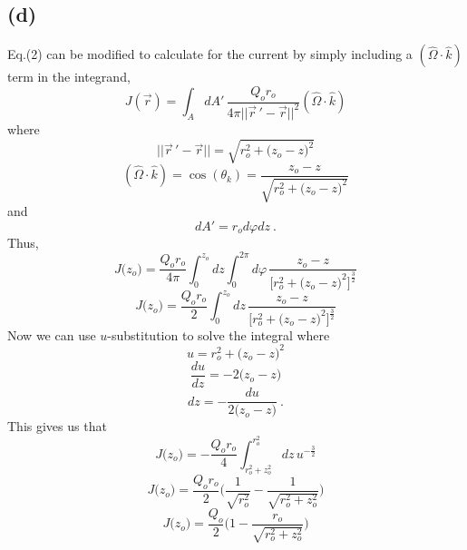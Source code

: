 \documentclass{article}
\begin{document}
\pagebreak

\subsection*{(d)}

Eq.(2) can be modified to calculate for the current by simply including a $(\hat{\Omega} \cdot \hat{k})$ term in the integrand, 
\begin{equation*}
J(\vec{r}) = \int_A dA' \, \frac{Q_o r_o}{4 \pi ||\vec{r}\,'-\vec{r}||^2} (\hat{\Omega} \cdot \hat{k})
\end{equation*}
where 
\begin{equation*}
||\vec{r}\,'-\vec{r}|| =  \sqrt{ r_o^2 + \big(z_o-z\big)^2 } 
\end{equation*}
\begin{equation*}
(\hat{\Omega} \cdot \hat{k}) = \cos(\theta_k) = \frac{z_o - z}{\sqrt{ r_o^2 + \big(z_o - z\big)^2 } }
\end{equation*}
and
\begin{equation*}
dA' = r_o d\varphi dz \: .
\end{equation*}
Thus,
\begin{equation*}
J\Big(z_o\Big) = \frac{Q_o r_o}{4\pi} \int_0^{z_o} dz \int_0^{2\pi} d\varphi \, \frac{z_o - z}{\Big[ r_o^2 + \big(z_o - z\big)^2 \Big]^{\frac{3}{2}}} 
\end{equation*}
\begin{equation*}
J\Big(z_o\Big) = \frac{Q_o r_o}{2} \int_0^{z_o} dz \, \frac{z_o - z}{\Big[ r_o^2 + \big(z_o - z\big)^2 \Big]^{\frac{3}{2}}} 
\end{equation*}
Now we can use $u$-substitution to solve the integral where
\begin{equation*}
u = r_o^2 + \big(z_o-z \big)^2
\end{equation*}
\begin{equation*}
\frac{du}{dz} = -2 \big(z_o-z \big)
\end{equation*}
\begin{equation*}
dz = - \frac{du}{2 \big(z_o-z \big)} \: .
\end{equation*}
This gives us that
\begin{equation*}
J\Big(z_o\Big) = - \frac{Q_o r_o}{4} \int_{r_o^2+z_o^2}^{r_o^2} dz \, u^{-\frac{3}{2}} 
\end{equation*}
\begin{equation*}
J\Big(z_o\Big) = \frac{Q_o r_o}{2} \Bigg( \frac{1}{\sqrt{r_o^2}} - \frac{1}{\sqrt{r_o^2+z_o^2}} \Bigg) 
\end{equation*}
\begin{equation*}
\boxed{ J\Big(z_o\Big) = \frac{Q_o}{2} \Bigg( 1 - \frac{r_o}{\sqrt{r_o^2+z_o^2}} \Bigg) } 
\end{equation*}
\end{document}

